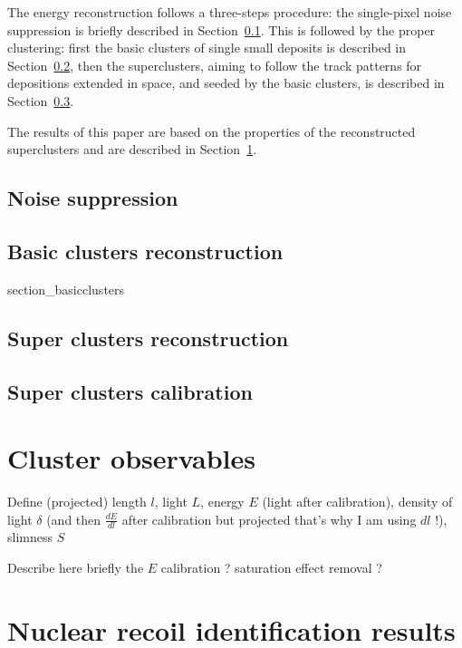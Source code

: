 \documentclass[12pt]{iopart}
\begin{document}
The energy reconstruction follows a three-steps procedure: the
single-pixel noise suppression is briefly described in
Section~\ref{sec:zerosuppression}. This is followed by the proper  clustering: first the basic clusters of single small deposits is
described in Section~\ref{sec:basiccl}, then the superclusters, aiming
to follow the track patterns for depositions extended in space, and
seeded by the basic clusters, is described in
Section~\ref{sec:supercl}.

The results of this paper are based on the properties of the
reconstructed superclusters and are described in
Section~\ref{sec:clustershapes}.


\subsection{Noise suppression}
\label{sec:zerosuppression}



\subsection{Basic clusters reconstruction}
\label{sec:basiccl}
 {section_basicclusters}


\subsection{Super clusters reconstruction}
\label{sec:supercl}


\subsection{Super clusters calibration}
\label{sec:calibration}



\section{Cluster observables}
\label{sec:clustershapes}
 
 Define  (projected) length $l$, light $L$, energy $E$ (light after calibration), density of light $\delta$ (and then $\frac{dE}{dl}$ after calibration but projected that's why I am using $dl$ !), slimness $S$
 
 Describe here briefly the $E$ calibration ? saturation effect removal ? 
 
\section{Nuclear recoil identification results}
 
\end{document}
